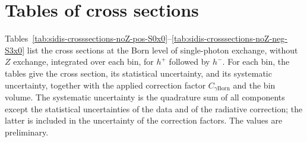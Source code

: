 \documentclass[11pt,a4paper]{article}
\newcommand{\hplus}{h^{+}}
\newcommand{\hminus}{h^{-}}
\newcommand{\Cgam}{C_{\gamma\mathrm{Born}}}
\begin{document}



\clearpage
\appendix
\section{Tables of cross sections}
\label{app:tables}

Tables~\ref{tab:sidis-crosssections-noZ-pos-S0x0}--\ref{tab:sidis-crosssections-noZ-neg-S3x0} list the cross sections at the Born level of single-photon exchange, without $Z$ exchange, integrated over each bin, for $\hplus$ followed by $\hminus$. For each bin, the tables give the cross section, its statistical uncertainty, and its systematic uncertainty, together with the applied correction factor $\Cgam$ and the bin volume. The systematic uncertainty is the quadrature sum of all components except the statistical uncertainties of the data and of the radiative correction; the latter is included in the uncertainty of the correction factors. The values are preliminary.

\begingroup
\makeatletter
\def\@floatboxreset{\reset@font\footnotesize\@setminipage}
\makeatother


\clearpage


\clearpage


\clearpage


\clearpage


\clearpage


\clearpage


\endgroup
\end{document}
